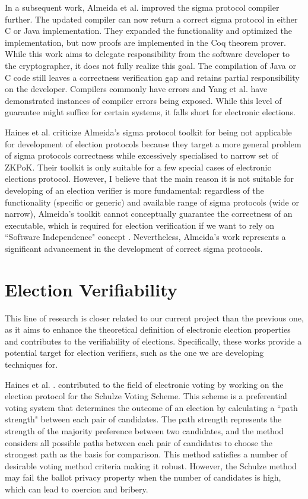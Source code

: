 In a subsequent work, Almeida et al. \cite{Almeida2012FullPC} improved the sigma protocol compiler further. The updated compiler can now return a correct sigma protocol in either C or Java implementation. They expanded the functionality and optimized the implementation, but now proofs are implemented in the Coq theorem prover. While this work aims to delegate responsibility from the software developer to the cryptographer, it does not fully realize this goal. The compilation of Java or C code still leaves a correctness verification gap and retains partial responsibility on the developer. Compilers commonly have errors and Yang et al. \cite{Yang2011FindingAU} have demonstrated instances of compiler errors being exposed. While this level of guarantee might suffice for certain systems, it falls short for electronic elections.

Haines et al.\cite{Haines2019VerifiedVF} criticize Almeida's sigma protocol toolkit for being not applicable for development of election protocols because they target a more general problem of sigma protocols correctness while excessively specialised to narrow set of ZKPoK. Their toolkit is only suitable for a few special cases of electronic elections protocol. However, I believe that the main reason it is not suitable for developing of an election verifier is more fundamental: regardless of the functionality (specific or generic) and available range of sigma protocols (wide or narrow), Almeida's toolkit cannot conceptually guarantee the correctness of an executable, which is required for election verification if we want to rely on   ``Software Independence" concept \cite{Rivest2008OnTN}. Nevertheless, Almeida's work represents a significant advancement in the development of correct sigma protocols.

\section{Election Verifiability}
This line of research is closer related to our current project than the previous one, as it aims to enhance the theoretical definition of electronic election properties and contributes to the verifiability of elections. Specifically, these works provide a potential target for election verifiers, such as the one we are developing techniques for.

Haines et al. \cite{Haines2019VerifiableHT}. contributed to the field of electronic voting by working on the election protocol for the Schulze Voting Scheme. This scheme is a preferential voting system that determines the outcome of an election by calculating a ``path strength" between each pair of candidates. The path strength represents the strength of the majority preference between two candidates, and the method considers all possible paths between each pair of candidates to choose the strongest path as the basis for comparison. This method satisfies a number of desirable voting method criteria making it robust. However, the Schulze method may fail the ballot privacy property when the number of candidates is high, which can lead to coercion and bribery.

